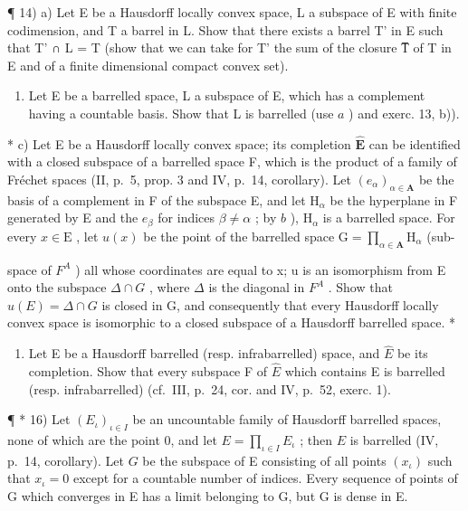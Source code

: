 ¶ 14) a) Let E be a Hausdorff locally convex space, L a subspace of E with finite codimension, and T a barrel in L. Show that there exists a barrel T' in E such that T' ∩ L = T (show that we can take for T' the sum of the closure T̅ of T in E and of a finite dimensional compact convex set).

\begin{enumerate}
\def\labelenumi{\alph{enumi})}
\setcounter{enumi}{1}
\tightlist
\item
  Let E be a barrelled space, L a subspace of E, which has a complement having a countable basis. Show that L is barrelled (use \(a\) ) and exerc. 13, b)).
\end{enumerate}

* c) Let E be a Hausdorff locally convex space; its completion \(\hat{\mathbf{E}}\) can be identified with a closed subspace of a barrelled space F, which is the product of a family of Fréchet spaces (II, p.~5, prop. 3 and IV, p.~14, corollary). Let \((e_{\alpha})_{\alpha \in \mathbf{A}}\) be the basis of a complement in F of the subspace E, and let \(\mathrm{H}_{\alpha}\) be the hyperplane in F generated by E and the \(e_{\beta}\) for indices \(\beta \neq \alpha\) ; by \(b\) ), \(\mathrm{H}_{\alpha}\) is a barrelled space. For every \(x \in \mathrm{E}\) , let \(u(x)\) be the point of the barrelled space \(\mathrm{G} = \prod_{\alpha \in \mathbf{A}} \mathrm{H}_{\alpha}\) (sub-

space of \(F^{A}\) ) all whose coordinates are equal to x; u is an isomorphism from E onto the subspace \(\Delta \cap G\) , where \(\Delta\) is the diagonal in \(F^{A}\) . Show that \(u(E) = \Delta \cap G\) is closed in G, and consequently that every Hausdorff locally convex space is isomorphic to a closed subspace of a Hausdorff barrelled space. *

\begin{enumerate}
\def\labelenumi{\arabic{enumi})}
\setcounter{enumi}{14}
\tightlist
\item
  Let E be a Hausdorff barrelled (resp. infrabarrelled) space, and \(\hat{E}\) be its completion. Show that every subspace F of \(\hat{E}\) which contains E is barrelled (resp. infrabarrelled) (cf.~III, p.~24, cor. and IV, p.~52, exerc. 1).
\end{enumerate}

¶ * 16) Let \((E_{\iota})_{\iota\in I}\) be an uncountable family of Hausdorff barrelled spaces, none of which are the point 0, and let \(E = \prod_{\iota \in I} E_{\iota}\) ; then \(E\) is barrelled (IV, p.~14, corollary). Let \(G\) be the subspace of E consisting of all points \((x_{\iota})\) such that \(x_{\iota}=0\) except for a countable number of indices. Every sequence of points of G which converges in E has a limit belonging to G, but G is dense in E.


